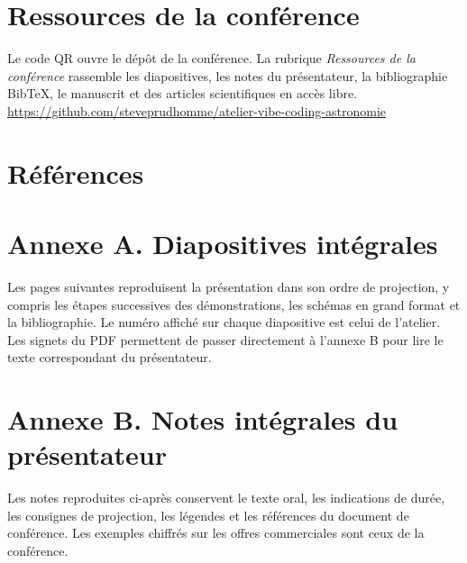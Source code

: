 \documentclass[11pt,letterpaper]{article}
\begin{document}
\section*{Ressources de la conférence}
\noindent\begin{minipage}{.20\linewidth}\centering
{}
\end{minipage}\hfill\begin{minipage}{.76\linewidth}
Le code QR ouvre le dépôt de la conférence. La rubrique \emph{Ressources de la conférence} rassemble les diapositives, les notes du présentateur, la bibliographie BibTeX, le manuscrit et des articles scientifiques en accès libre.\\[3pt]
\url{https://github.com/steveprudhomme/atelier-vibe-coding-astronomie}
\end{minipage}

\section*{Références}
\nocite{ref07,ref18,ref19,ref20,ref21,ref23,articleAstropy,articleFits}


\clearpage
{}
\section*{Annexe A. Diapositives intégrales}
Les pages suivantes reproduisent la présentation dans son ordre de projection, y compris les étapes successives des démonstrations, les schémas en grand format et la bibliographie. Le numéro affiché sur chaque diapositive est celui de l'atelier. Les signets du PDF permettent de passer directement à l'annexe B pour lire le texte correspondant du présentateur.

\clearpage
{}
\section*{Annexe B. Notes intégrales du présentateur}
Les notes reproduites ci-après conservent le texte oral, les indications de durée, les consignes de projection, les légendes et les références du document de conférence. Les exemples chiffrés sur les offres commerciales sont ceux de la conférence.

\end{document}
